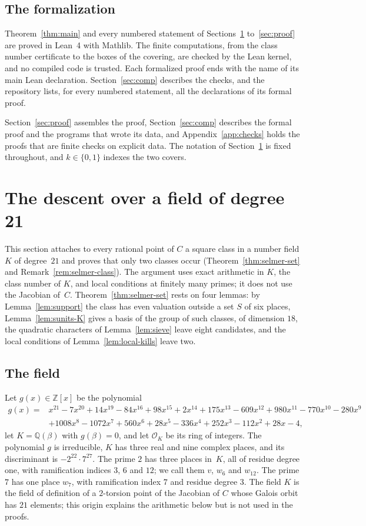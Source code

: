\documentclass[11pt]{amsart}
\theoremstyle{definition}
\numberwithin{equation}{section}
\newcommand{\Q}{\mathbb{Q}}
\newcommand{\Z}{\mathbb{Z}}
\newcommand{\OK}{\mathcal{O}_K}
\begin{document}
\subsection*{The formalization}
Theorem~\ref{thm:main} and every numbered statement of Sections~\ref{sec:descent} to~\ref{sec:proof} are proved in Lean~4 with Mathlib. The finite computations, from the class number certificate to the boxes of the covering, are checked by the Lean kernel, and no compiled code is trusted. Each formalized proof ends with the name of its main Lean declaration. Section~\ref{sec:comp} describes the checks, and the repository lists, for every numbered statement, all the declarations of its formal proof.

Section~\ref{sec:proof} assembles the proof, Section~\ref{sec:comp} describes the formal proof and the programs that wrote its data, and Appendix~\ref{app:checks} holds the proofs that are finite checks on explicit data. The notation of Section~\ref{sec:descent} is fixed throughout, and $k\in\{0,1\}$ indexes the two covers.

\section{The descent over a field of degree 21}\label{sec:descent}

This section attaches to every rational point of $C$ a square class in a number field $K$ of degree~$21$ and proves that only two classes occur (Theorem~\ref{thm:selmer-set} and Remark~\ref{rem:selmer-class}). The argument uses exact arithmetic in $K$, the class number of $K$, and local conditions at finitely many primes; it does not use the Jacobian of~$C$. Theorem~\ref{thm:selmer-set} rests on four lemmas: by Lemma~\ref{lem:support} the class has even valuation outside a set $S$ of six places, Lemma~\ref{lem:sunits-K} gives a basis of the group of such classes, of dimension $18$, the quadratic characters of Lemma~\ref{lem:sieve} leave eight candidates, and the local conditions of Lemma~\ref{lem:local-kills} leave two.

\subsection{The field}
Let $g(x)\in\Z[x]$ be the polynomial
\[
\begin{aligned}
g(x)={}&x^{21}-7x^{20}+14x^{19}-84x^{16}+98x^{15}+2x^{14}+175x^{13}-609x^{12}+980x^{11}-770x^{10}-280x^{9}\\
&+1008x^{8}-1072x^{7}+560x^{6}+28x^{5}-336x^{4}+252x^{3}-112x^{2}+28x-4,
\end{aligned}
\]
let $K=\Q(\beta)$ with $g(\beta)=0$, and let $\OK$ be its ring of integers. The polynomial $g$ is irreducible, $K$ has three real and nine complex places, and its discriminant is $-2^{22}\cdot7^{27}$. The prime $2$ has three places in~$K$, all of residue degree one, with ramification indices $3$, $6$ and $12$; we call them $v$, $w_6$ and $w_{12}$. The prime $7$ has one place $w_7$, with ramification index $7$ and residue degree $3$. The field $K$ is the field of definition of a $2$-torsion point of the Jacobian of $C$ whose Galois orbit has $21$ elements; this origin explains the arithmetic below but is not used in the proofs.
\end{document}
